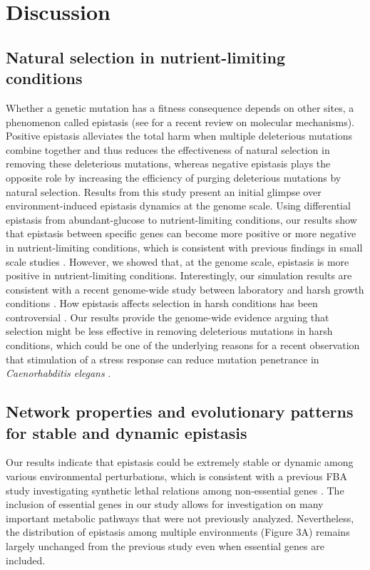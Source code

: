 \section{Discussion}

\subsection{Natural selection in nutrient-limiting conditions}

Whether a genetic mutation has a fitness consequence depends on other
sites, a phenomenon called epistasis (see \citealt{Lehner2011} for a
recent review on
molecular mechanisms). Positive epistasis alleviates the total harm
when multiple deleterious mutations combine together and thus reduces
the effectiveness of natural selection in removing these deleterious
mutations, whereas negative epistasis plays the opposite role by
increasing the efficiency of purging deleterious mutations by natural
selection. Results from this study present an initial glimpse over
environment-induced epistasis dynamics at the genome scale. Using
differential epistasis from abundant-glucose to nutrient-limiting
conditions, our results show that epistasis between specific genes can
become more positive or more negative in nutrient-limiting conditions,
which is consistent with previous findings in small scale studies
\citep{Remold2001, Kishony2003, Cooper2005, Korona1999, Szafraniec2001,
Jasnos2008, Vassilieva2000, Baer2006, Yang2001, Fry2002,
AletheaD.Wang2009, Young2009}. However, we showed that, at the genome
scale, epistasis is
more positive in nutrient-limiting conditions. Interestingly, our
simulation results are consistent with a recent genome-wide study
between laboratory and harsh growth conditions
\citep{Bandyopadhyay2011}. How epistasis affects selection in harsh
conditions has been controversial \citep{Agrawal2010}. Our
results provide the genome-wide evidence arguing that selection might
be less effective in removing deleterious mutations in harsh
conditions, which could be one of the underlying reasons for a recent
observation that stimulation of a stress response can reduce mutation
penetrance in \textit{Caenorhabditis elegans} \citep{Casanueva2012}.

\subsection{Network properties and evolutionary patterns for stable
and dynamic epistasis}

Our results indicate that epistasis could be extremely stable or
dynamic among various environmental perturbations, which is consistent
with a previous FBA study investigating synthetic lethal relations
among non-essential genes \citep{Harrison2007}. The inclusion of
essential genes in our study allows for investigation on many
important metabolic
pathways that were not previously analyzed. Nevertheless, the
distribution of epistasis among multiple environments (Figure 3A)
remains largely unchanged from the previous study \citep{Harrison2007}
even when essential genes are included.

